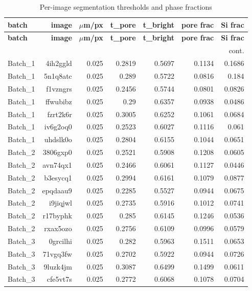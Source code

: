 \documentclass[11pt,a4paper]{article}
\begin{document}
\begin{longtable}{lrrrrrr}
\caption{Per-image segmentation thresholds and phase fractions}\label{tab:seginfo}\\
\toprule
\textbf{batch} & \textbf{image} & \textbf{$\mu$m/px} & \textbf{t\_pore} & \textbf{t\_bright} & \textbf{pore frac} & \textbf{Si frac} \\
\midrule
\endfirsthead
\toprule \textbf{batch} & \textbf{image} & \textbf{$\mu$m/px} & \textbf{t\_pore} & \textbf{t\_bright} & \textbf{pore frac} & \textbf{Si frac} \\
\midrule
\endhead
\midrule\multicolumn{7}{r}{\footnotesize cont.}\\\midrule\endfoot
\bottomrule\endlastfoot
Batch\_1 & 4ih2ggld & 0.025 & 0.2819 & 0.5697 & 0.1134 & 0.1686 \\
Batch\_1 & 5n1q8atc & 0.025 & 0.289 & 0.5722 & 0.0816 & 0.184 \\
Batch\_1 & f1vzngrs & 0.025 & 0.2456 & 0.5744 & 0.0801 & 0.0826 \\
Batch\_1 & ffwubibz & 0.025 & 0.29 & 0.6357 & 0.0938 & 0.0486 \\
Batch\_1 & fzrt2k6r & 0.025 & 0.3005 & 0.6252 & 0.1061 & 0.0684 \\
Batch\_1 & iv6g2oq0 & 0.025 & 0.2523 & 0.6027 & 0.1116 & 0.061 \\
Batch\_1 & uhdslk0o & 0.025 & 0.2804 & 0.6155 & 0.1044 & 0.0651 \\
Batch\_2 & 3806gxp0 & 0.025 & 0.2521 & 0.5908 & 0.1208 & 0.0605 \\
Batch\_2 & avn74qx1 & 0.025 & 0.2466 & 0.6061 & 0.1127 & 0.0446 \\
Batch\_2 & b3esycq1 & 0.025 & 0.2994 & 0.6161 & 0.1079 & 0.0877 \\
Batch\_2 & epqdaau9 & 0.025 & 0.2285 & 0.5527 & 0.0944 & 0.0675 \\
Batch\_2 & i9jiqjwl & 0.025 & 0.2735 & 0.5916 & 0.1012 & 0.0741 \\
Batch\_2 & r17byphk & 0.025 & 0.285 & 0.6145 & 0.1246 & 0.0536 \\
Batch\_2 & rxax5ozo & 0.025 & 0.2756 & 0.6109 & 0.0996 & 0.0579 \\
Batch\_3 & 0grcilhi & 0.025 & 0.282 & 0.5963 & 0.1511 & 0.0653 \\
Batch\_3 & 71vgq3fw & 0.025 & 0.2702 & 0.5922 & 0.0944 & 0.0726 \\
Batch\_3 & 9luzk4jm & 0.025 & 0.3087 & 0.6499 & 0.1499 & 0.0611 \\
Batch\_3 & cfe5vt7s & 0.025 & 0.2772 & 0.6068 & 0.1078 & 0.0704 \\

\end{longtable}
\end{document}
